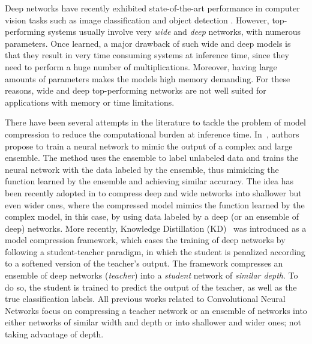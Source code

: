 \documentclass{article} %
\begin{document}
Deep networks have recently exhibited state-of-the-art performance in computer vision tasks
such as image classification and object detection
\citep{simonyan.2014,Szegedy14}. However, top-performing systems usually involve very \emph{wide} and
\emph{deep} networks, with numerous parameters. Once learned, a major drawback
of such wide and deep models is that they result in very time consuming
systems at inference time, since they need to perform a huge number of
multiplications. Moreover, having large amounts of parameters makes the models
high memory demanding. For these reasons, wide and deep top-performing
networks are not well suited for applications with memory or time limitations.

There have been several attempts in the literature to tackle the problem of model compression to reduce the computational burden at inference
time. In~\citet{Bucila06}, authors propose to train a neural network to mimic
the output of a complex and large ensemble. The method uses the ensemble to
label unlabeled data and trains the neural network with the data labeled by
the ensemble, thus mimicking the function learned by the ensemble and
achieving similar accuracy. The idea has been recently adopted in
\citet{ba.2013} to compress deep and wide networks into shallower but even
wider ones, where the compressed model mimics the function learned by the
complex model, in this case, by using data labeled by a deep (or an ensemble of
deep) networks. More recently, Knowledge Distillation (KD)~\citep{Hinton14} was introduced as a
model compression framework, which eases the training of deep networks by following a student-teacher
paradigm, in which the student is penalized according to a softened version of the teacher's
output. The framework compresses an ensemble of deep
networks (\emph{teacher}) into a \emph{student} network of \emph{similar depth}. To do so, the
student is trained to predict the output of the teacher, as
well as the true classification labels. All previous works related to Convolutional Neural Networks focus on compressing a teacher network or an ensemble of networks into either networks of similar width and depth or into shallower and wider ones; not taking advantage of depth.

\end{document}
